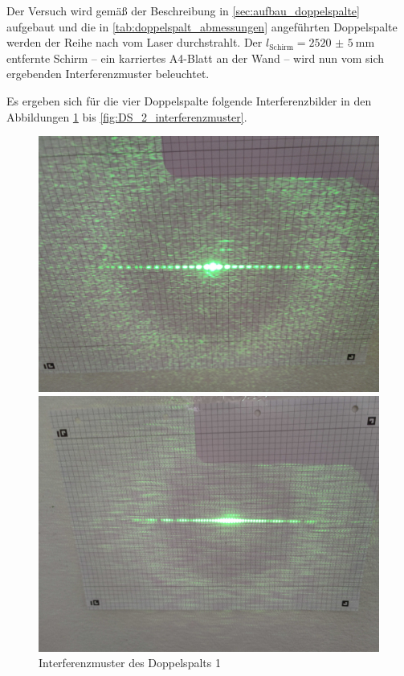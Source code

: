 \documentclass[ngerman]{scrartcl}
\begin{document}
Der Versuch wird gemäß der Beschreibung in \autoref{sec:aufbau_doppelspalte} aufgebaut und die in \autoref{tab:doppelspalt_abmessungen} angeführten Doppelspalte werden der Reihe nach vom Laser durchstrahlt. Der $l_\text{Schirm} = \SI{2520(5)}{\milli\meter}$ entfernte Schirm -- ein karriertes A4-Blatt an der Wand -- wird nun vom sich ergebenden Interferenzmuster beleuchtet.

Es ergeben sich für die vier Doppelspalte folgende Interferenzbilder in den Abbildungen \ref{fig:DS_1_interferenzmuster} bis \ref{fig:DS_2_interferenzmuster}.
%
\setcapindent{0pt}
\begin{figure}[H]
    \centering
    \begin{minipage}[t]{0.45\linewidth}
        \centering
        \includegraphics[width=\linewidth]{fig/Compressed/DS1_0_20_25.jpg}
        \caption{Interferenzmuster des Doppelspalts 1}
        \label{fig:DS_1_interferenzmuster}
        \includegraphics[width=\linewidth]{fig/Compressed/DS3_0_10_5.jpg}

\end{minipage}
\end{figure}
\end{document}
